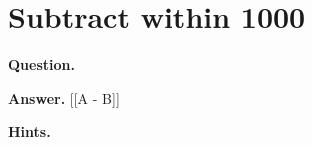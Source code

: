 \documentclass{article}
\begin{document}
\section*{Subtract within 1000}
\textbf{Question.} 

\textbf{Answer.} [[A - B]]

\textbf{Hints.}
\begin{itemize}

\end{itemize}
\end{document}
